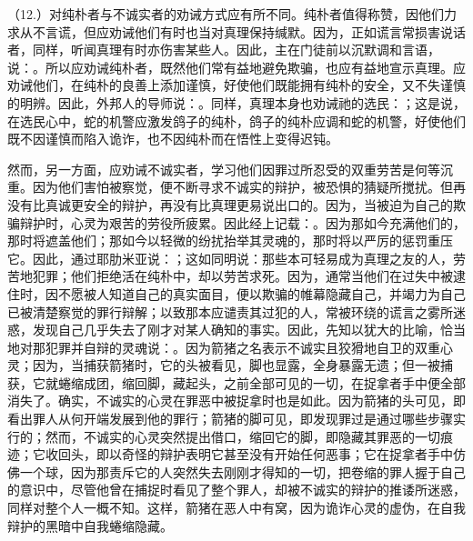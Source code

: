 （12.）对纯朴者与不诚实者的劝诫方式应有所不同。纯朴者值得称赞，因他们力求从不言谎，但应劝诫他们有时也当对真理保持缄默。因为，正如谎言常损害说话者，同样，听闻真理有时亦伤害某些人。因此，主在门徒前以沉默调和言语，说：。所以应劝诫纯朴者，既然他们常有益地避免欺骗，也应有益地宣示真理。应劝诫他们，在纯朴的良善上添加谨慎，好使他们既能拥有纯朴的安全，又不失谨慎的明辨。因此，外邦人的导师说：。同样，真理本身也劝诫祂的选民：；这是说，在选民心中，蛇的机警应激发鸽子的纯朴，鸽子的纯朴应调和蛇的机警，好使他们既不因谨慎而陷入诡诈，也不因纯朴而在悟性上变得迟钝。\par

然而，另一方面，应劝诫不诚实者，学习他们因罪过所忍受的双重劳苦是何等沉重。因为他们害怕被察觉，便不断寻求不诚实的辩护，被恐惧的猜疑所搅扰。但再没有比真诚更安全的辩护，再没有比真理更易说出口的。因为，当被迫为自己的欺骗辩护时，心灵为艰苦的劳役所疲累。因此经上记载：。因为那如今充满他们的，那时将遮盖他们；那如今以轻微的纷扰抬举其灵魂的，那时将以严厉的惩罚重压它。因此，通过耶肋米亚说：；这如同明说：那些本可轻易成为真理之友的人，劳苦地犯罪；他们拒绝活在纯朴中，却以劳苦求死。因为，通常当他们在过失中被逮住时，因不愿被人知道自己的真实面目，便以欺骗的帷幕隐藏自己，并竭力为自己已被清楚察觉的罪行辩解；以致那本应谴责其过犯的人，常被环绕的谎言之雾所迷惑，发现自己几乎失去了刚才对某人确知的事实。因此，先知以犹大的比喻，恰当地对那犯罪并自辩的灵魂说：。因为箭猪之名表示不诚实且狡猾地自卫的双重心灵；因为，当捕获箭猪时，它的头被看见，脚也显露，全身暴露无遗；但一被捕获，它就蜷缩成团，缩回脚，藏起头，之前全部可见的一切，在捉拿者手中便全部消失了。确实，不诚实的心灵在罪恶中被捉拿时也是如此。因为箭猪的头可见，即看出罪人从何开端发展到他的罪行；箭猪的脚可见，即发现罪过是通过哪些步骤实行的；然而，不诚实的心灵突然提出借口，缩回它的脚，即隐藏其罪恶的一切痕迹；它收回头，即以奇怪的辩护表明它甚至没有开始任何恶事；它在捉拿者手中仿佛一个球，因为那责斥它的人突然失去刚刚才得知的一切，把卷缩的罪人握于自己的意识中，尽管他曾在捕捉时看见了整个罪人，却被不诚实的辩护的推诿所迷惑，同样对整个人一概不知。这样，箭猪在恶人中有窝，因为诡诈心灵的虚伪，在自我辩护的黑暗中自我蜷缩隐藏。\par

